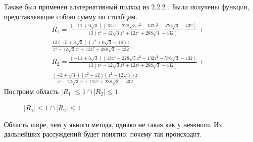 \documentclass[a4paper,article,14pt]{extarticle}
\begin{document}
Также был применен альтернативный подход из 2.2.2 \cite{stability}.
Были получены функции, представляющие собою сумму по столбцам.
\begin{equation}
\begin{gathered}
R_{1} = \frac{(-11 + 6\sqrt{3})(13 z^{4} - 228\sqrt{3} z^{2} - 132 z^{2} - 576 \sqrt{3} - 432)}{13 (z^{4} - 12 \sqrt{3} z^{2} + 12 z^{2} + 288\sqrt{3} - 432)} + \\ \frac{12 (-5 + 3\sqrt{3}) (z^{2} + 6\sqrt{3} + 18) z}{z^{4} - 12\sqrt{3} z^{2} + 12 z^{2} + 288\sqrt{3} - 432}, \\
R_{2} = \frac{(-11 + 6\sqrt{3}) (13 z^{4} - 228\sqrt{3} z^{2} - 132 z^{2} - 576\sqrt{3} - 432)}{13 (z^{4} - 12\sqrt{3} z^{2} + 12 z^{2} + 288\sqrt{3} - 432)} + \\ \frac{(-2 + \sqrt{3}) (z^{2} + 12) (z^{2} - 12\sqrt{3}) z}{z^{4} - 12\sqrt{3} z^{2} + 12 z^{2} + 288\sqrt{3} - 432}
\end{gathered}
\end{equation}
Построим область $\lvert R_{1} \rvert \leq 1 \cap \lvert R_{2} \rvert \leq 1$.

\begin{figure}[ht]
\begin{center}
\caption{
\label{stab_area_another}
     $\lvert R_{1} \rvert \leq 1 \cap \lvert R_{2} \rvert \leq 1$}
\end{center}
\end{figure}

Область шире, чем у явного метода, однако не такая как у неявного. Из дальнейших рассуждений будет понятно, почему так происходит. 
\pagebreak
\end{document}
